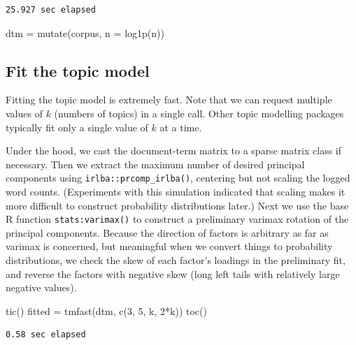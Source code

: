 \documentclass[
]{article}
\newenvironment{Shaded}{\begin{snugshade}}{\end{snugshade}}
\newcommand{\AttributeTok}[1]{\textcolor[rgb]{0.40,0.45,0.13}{#1}}
\newcommand{\DecValTok}[1]{\textcolor[rgb]{0.68,0.00,0.00}{#1}}
\newcommand{\FunctionTok}[1]{\textcolor[rgb]{0.28,0.35,0.67}{#1}}
\newcommand{\NormalTok}[1]{\textcolor[rgb]{0.00,0.23,0.31}{#1}}
\newcommand{\OtherTok}[1]{\textcolor[rgb]{0.00,0.23,0.31}{#1}}
\newcommand{\SpecialCharTok}[1]{\textcolor[rgb]{0.37,0.37,0.37}{#1}}
\begin{document}
\begin{verbatim}
25.927 sec elapsed
\end{verbatim}

\begin{Shaded}
\begin{Highlighting}[]
\NormalTok{dtm }\OtherTok{=} \FunctionTok{mutate}\NormalTok{(corpus, }\AttributeTok{n =} \FunctionTok{log1p}\NormalTok{(n))}
\end{Highlighting}
\end{Shaded}

\hypertarget{fit-the-topic-model}{%
\subsection{Fit the topic model}\label{fit-the-topic-model}}

Fitting the topic model is extremely fast. Note that we can request
multiple values of \(k\) (numbers of topics) in a single call. Other
topic modelling packages typically fit only a single value of \(k\) at a
time.

Under the hood, we cast the document-term matrix to a sparse matrix
class if necessary. Then we extract the maximum number of desired
principal components using \texttt{irlba::prcomp\_irlba()}, centering
but not scaling the logged word counts. (Experiments with this
simulation indicated that scaling makes it more difficult to construct
probability distributions later.) Next we use the base R function
\texttt{stats:varimax()} to construct a preliminary varimax rotation of
the principal components. Because the direction of factors is arbitrary
as far as varimax is concerned, but meaningful when we convert things to
probability distributions, we check the skew of each factor's loadings
in the preliminary fit, and reverse the factors with negative skew (long
left tails with relatively large negative values).

\begin{Shaded}
\begin{Highlighting}[]
\FunctionTok{tic}\NormalTok{()}
\NormalTok{fitted }\OtherTok{=} \FunctionTok{tmfast}\NormalTok{(dtm, }\FunctionTok{c}\NormalTok{(}\DecValTok{3}\NormalTok{, }\DecValTok{5}\NormalTok{, k, }\DecValTok{2}\SpecialCharTok{*}\NormalTok{k))}
\FunctionTok{toc}\NormalTok{()}
\end{Highlighting}
\end{Shaded}

\begin{verbatim}
0.58 sec elapsed
\end{verbatim}
\end{document}
